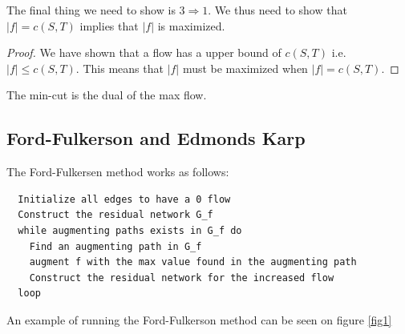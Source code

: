 \documentclass[10pt]{article}
\begin{document}
The final thing we need to show is $3 \Rightarrow 1$. We thus need to show that $|f| = c(S,T)$ implies that $|f|$ is maximized. 

\begin{proof}
  We have shown that a flow has a upper bound of $c(S,T)$ i.e. $|f| \leq c(S,T)$. This means that $|f|$ must be maximized when $|f| = c(S,T)$.  
\end{proof}

The min-cut is the dual of the max flow.

                                                          
\subsection{Ford-Fulkerson and Edmonds Karp} %
\label{sub:ford_fulkerson_and_edmonds_karp}
The Ford-Fulkersen method works as follows:
\begin{verbatim}
  Initialize all edges to have a 0 flow
  Construct the residual network G_f   
  while augmenting paths exists in G_f do
    Find an augmenting path in G_f
    augment f with the max value found in the augmenting path 
    Construct the residual network for the increased flow
  loop 
\end{verbatim}

An example of running the Ford-Fulkerson method can be seen on figure \ref{fig1}
\end{document}
